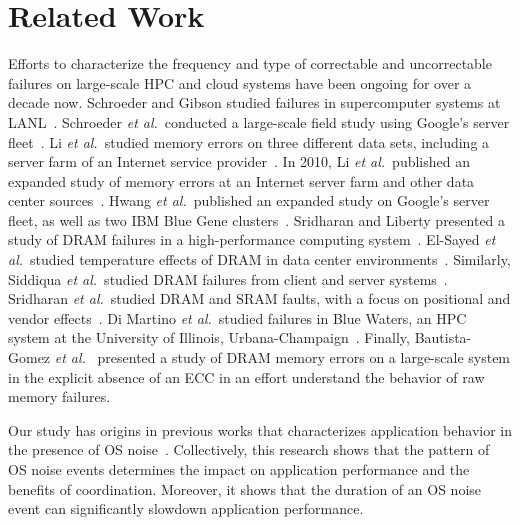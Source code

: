 
\section{Related Work}
\label{sec:related}

Efforts to characterize the frequency and type of correctable and uncorrectable
failures on large-scale HPC and cloud systems have been ongoing for over a
decade now.  Schroeder and Gibson studied failures in supercomputer systems at
LANL~\cite{Schroeder:2006:Large-scale}.  Schroeder {\it et al.}~conducted a
large-scale field study using Google's server fleet~\cite{Schroeder09}.  Li {\it
et al.}~studied memory errors on three different data sets, including a server
farm of an Internet service provider~\cite{Li07}.  In 2010, Li {\it et
al.}~published an expanded study of memory errors at an Internet server farm and
other data center sources~\cite{Li10}.  Hwang {\it et al.}~published an expanded
study on Google's server fleet, as well as two IBM Blue Gene
clusters~\cite{Hwang12}.  Sridharan and Liberty presented a study of DRAM
failures in a high-performance computing system~\cite{Sridharan12}.  El-Sayed
{\it et al.}~studied temperature effects of DRAM in data center
environments~\cite{Elsayed12}.  Similarly, Siddiqua {\it et al.}~studied DRAM
failures from client and server systems~\cite{Siddiqua13}.  Sridharan {\it et
al.}~studied DRAM and SRAM faults, with a focus on positional and vendor
effects~\cite{Sridharan13}.  Di Martino {\it et al.}~studied failures in Blue
Waters, an HPC system at the University of Illinois,
Urbana-Champaign~\cite{bluewaters}.  Finally, Bautista-Gomez {\it et
al.}~\cite{Bautista-Gomez:2016:Unprotected} presented a study of DRAM memory
errors on a large-scale system in the explicit absence of an ECC in an effort
understand the behavior of raw memory failures.


Our study has origins in previous works that characterizes application behavior
in the presence of OS
noise~\cite{Ferreira:2008:Characterizing,Hoefler:2010:Characterizing}.
Collectively, this research shows that the pattern of OS noise events determines
the impact on application performance and the benefits of coordination.
Moreover, it shows that the duration of an OS noise event can significantly
slowdown application performance.

